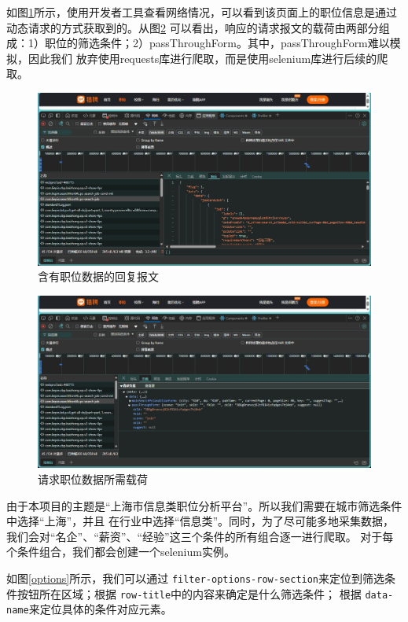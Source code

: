 如图\ref{response}所示，使用开发者工具查看网络情况，可以看到该页面上的职位信息是通过动态请求的方式获取到的。从图\ref{payload}
可以看出，响应的请求报文的载荷由两部分组成：1）职位的筛选条件；2）passThroughForm。其中，passThroughForm难以模拟，因此我们
放弃使用requests库进行爬取，而是使用selenium库进行后续的爬取。

\begin{figure}[!htbp]
    \centering
    \includegraphics[width=\textwidth]{figures/response.png}
    \caption{含有职位数据的回复报文}\label{response}
\end{figure}

\begin{figure}[!htbp]
    \centering
    \includegraphics[width=\textwidth]{figures/payload.png}
    \caption{请求职位数据所需载荷}\label{payload}
\end{figure}

由于本项目的主题是“上海市信息类职位分析平台”。所以我们需要在城市筛选条件中选择“上海”，并且
在行业中选择“信息类”。同时，为了尽可能多地采集数据，我们会对“名企”、“薪资”、“经验”这三个条件的所有组合逐一进行爬取。
对于每个条件组合，我们都会创建一个selenium实例。

如图\ref{options}所示，我们可以通过 \texttt{filter-options-row-section}来定位到筛选条件按钮所在区域；根据 \texttt{row-title}中的内容来确定是什么筛选条件；
根据 \texttt{data-name}来定位具体的条件对应元素。



